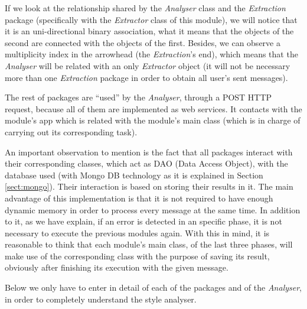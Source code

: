 If we look at the relationship shared by the \textit{Analyser} class and the \textit{Extraction} package (specifically with the \textit{Extractor} class of this module), we will notice that it is an uni-directional binary association, what it means that the objects of the second are connected with the objects of the first. Besides, we can observe a multiplicity index in the arrowhead (the \textit{Extraction}'s end), which means that the \textit{Analyser} will be related with an only \textit{Extractor} object (it will not be necessary more than one \textit{Extraction} package in order to obtain all user's sent messages).

The rest of packages are ``used'' by the \textit{Analyser}, through a POST HTTP request, because all of them are implemented as web services. It contacts with the module's app which is related with the module's main class (which is in charge of carrying out its corresponding task).

An important observation to mention is the fact that all packages interact with their corresponding classes, which act as DAO (Data Access Object), with the database used (with Mongo DB technology as it is explained in Section \ref{sect:mongo}). Their interaction is based on storing their results in it. The main advantage of this implementation is that it is not required to have enough dynamic memory in order to process every message at the same time. In addition to it, as we have explain, if an error is detected in an specific phase, it is not necessary to execute the previous modules again. With this in mind, it is reasonable to think that each module's main class, of the last three phases, will make use of the corresponding class with the purpose of saving its result, obviously after finishing its execution with the given message.

Below we only have to enter in detail of each of the packages and of the \textit{Analyser}, in order to completely understand the style analyser.
